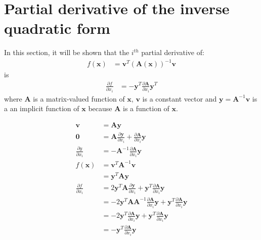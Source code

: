 \appendix
\addappheadtotoc
\setcounter{table}{0}
\renewcommand{\thetable}{A\arabic{table}}

\setcounter{figure}{0}
\renewcommand{\thefigure}{B\arabic{figure}}

\section{Partial derivative of the inverse quadratic form} \label{app1}

In this section, it will be shown that the $i^{th}$ partial derivative of:
\begin{align}
  f(\bm{x}) & = \bm{v}^T (\bm{A}(\bm{x}))^{-1} \bm{v}
\end{align}
is
\begin{align}
  \frac{\partial f}{\partial x_i} & = -\bm{y}^T \frac{\partial \bm{A}}{\partial x_i} \bm{y}^T
\end{align}
where $\bm{A}$ is a matrix-valued function of $\bm{x}$, $\bm{v}$ is a constant vector and $\bm{y} = \bm{A}^{-1} \bm{v}$ is a an implicit function of $\bm{x}$ because $\bm{A}$ is a function of $\bm{x}$.

\begin{align}
  \bm{v} & = \bm{A} \bm{y} \\
  \bm{0} & = \bm{A} \frac{\partial \bm{y}}{\partial x_i} + \frac{\partial \bm{A}}{\partial x_i} \bm{y} \\
  \frac{\partial y}{\partial x_i} & = - \bm{A}^{-1} \frac{\partial \bm{A}}{\partial x_i} \bm{y} \\
  f(\bm{x}) & = \bm{v}^T \bm{A}^{-1} \bm{v} \\
  & = \bm{y}^T \bm{A} \bm{y} \\
  \frac{\partial f}{\partial x_i} & = 2 \bm{y}^T \bm{A} \frac{\partial \bm{y}}{\partial x_i} + \bm{y}^T \frac{\partial \bm{A}}{\partial x_i} \bm{y} \\
  & = - 2 \bm{y}^T \bm{A} \bm{A}^{-1} \frac{\partial \bm{A}}{\partial x_i} \bm{y} + \bm{y}^T \frac{\partial \bm{A}}{\partial x_i} \bm{y} \\
  & = - 2 \bm{y}^T \frac{\partial \bm{A}}{\partial x_i} \bm{y} + \bm{y}^T \frac{\partial \bm{A}}{\partial x_i} \bm{y} \\
  & = - \bm{y}^T \frac{\partial \bm{A}}{\partial x_i} \bm{y}
\end{align}
